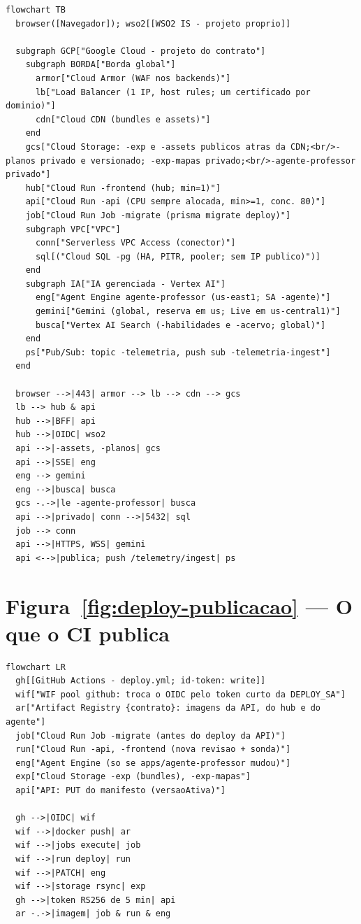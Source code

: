 \begin{lstlisting}[language=mermaid]
flowchart TB
  browser([Navegador]); wso2[[WSO2 IS - projeto proprio]]

  subgraph GCP["Google Cloud - projeto do contrato"]
    subgraph BORDA["Borda global"]
      armor["Cloud Armor (WAF nos backends)"]
      lb["Load Balancer (1 IP, host rules; um certificado por dominio)"]
      cdn["Cloud CDN (bundles e assets)"]
    end
    gcs["Cloud Storage: -exp e -assets publicos atras da CDN;<br/>-planos privado e versionado; -exp-mapas privado;<br/>-agente-professor privado"]
    hub["Cloud Run -frontend (hub; min=1)"]
    api["Cloud Run -api (CPU sempre alocada, min>=1, conc. 80)"]
    job["Cloud Run Job -migrate (prisma migrate deploy)"]
    subgraph VPC["VPC"]
      conn["Serverless VPC Access (conector)"]
      sql[("Cloud SQL -pg (HA, PITR, pooler; sem IP publico)")]
    end
    subgraph IA["IA gerenciada - Vertex AI"]
      eng["Agent Engine agente-professor (us-east1; SA -agente)"]
      gemini["Gemini (global, reserva em us; Live em us-central1)"]
      busca["Vertex AI Search (-habilidades e -acervo; global)"]
    end
    ps["Pub/Sub: topic -telemetria, push sub -telemetria-ingest"]
  end

  browser -->|443| armor --> lb --> cdn --> gcs
  lb --> hub & api
  hub -->|BFF| api
  hub -->|OIDC| wso2
  api -->|-assets, -planos| gcs
  api -->|SSE| eng
  eng --> gemini
  eng -->|busca| busca
  gcs -.->|le -agente-professor| busca
  api -->|privado| conn -->|5432| sql
  job --> conn
  api -->|HTTPS, WSS| gemini
  api <-->|publica; push /telemetry/ingest| ps
\end{lstlisting}

\section{Figura~\ref{fig:deploy-publicacao} --- O que o CI publica}

\begin{lstlisting}[language=mermaid]
flowchart LR
  gh[[GitHub Actions - deploy.yml; id-token: write]]
  wif["WIF pool github: troca o OIDC pelo token curto da DEPLOY_SA"]
  ar["Artifact Registry {contrato}: imagens da API, do hub e do agente"]
  job["Cloud Run Job -migrate (antes do deploy da API)"]
  run["Cloud Run -api, -frontend (nova revisao + sonda)"]
  eng["Agent Engine (so se apps/agente-professor mudou)"]
  exp["Cloud Storage -exp (bundles), -exp-mapas"]
  api["API: PUT do manifesto (versaoAtiva)"]

  gh -->|OIDC| wif
  wif -->|docker push| ar
  wif -->|jobs execute| job
  wif -->|run deploy| run
  wif -->|PATCH| eng
  wif -->|storage rsync| exp
  gh -->|token RS256 de 5 min| api
  ar -.->|imagem| job & run & eng
\end{lstlisting}

